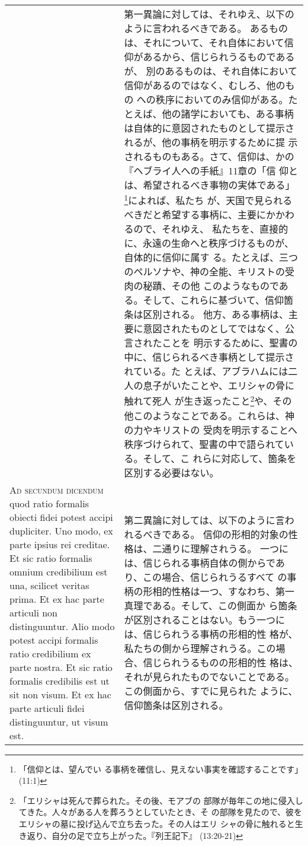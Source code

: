 \documentclass[10pt]{jsarticle} %
\begin{document}
\begin{longtable}{p{21em}p{21em}}
&


第一異論に対しては、それゆえ、以下のように言われるべきである。
あるものは、それについて、それ自体において信仰があるから、信じられうるものであるが、
 別のあるものは、それ自体において信仰があるのではなく、むしろ、他のもの
 への秩序においてのみ信仰がある。たとえば、他の諸学においても、ある事柄
 は自体的に意図されたものとして提示されるが、他の事柄を明示するために提
 示されるものもある。さて、信仰は、かの『ヘブライ人への手紙』11章の「信
 仰とは、希望されるべき事物の実体である」\footnote{「信仰とは、望んでい
 る事柄を確信し、見えない事実を確認することです」(11:1)}によれば、私たち
 が、天国で見られるべきだと希望する事柄に、主要にかかわるので、それゆえ、
 私たちを、直接的に、永遠の生命へと秩序づけるものが、自体的に信仰に属す
 る。たとえば、三つのペルソナや、神の全能、キリストの受肉の秘蹟、その他
 このようなものである。そして、これらに基づいて、信仰箇条は区別される。
 他方、ある事柄は、主要に意図されたものとしてではなく、公言されたことを
 明示するために、聖書の中に、信じられるべき事柄として提示されている。た
 とえば、アブラハムには二人の息子がいたことや、エリシャの骨に触れて死人
 が生き返ったこと\footnote{「エリシャは死んで葬られた。その後、モアブの
 部隊が毎年この地に侵入してきた。人々がある人を葬ろうとしていたとき、そ
 の部隊を見たので、彼をエリシャの墓に投げ込んで立ち去った。その人はエリ
 シャの骨に触れると生き返り、自分の足で立ち上がった。『列王記下』
 (13:20-21)}や、その他このようなことである。これらは、神の力やキリストの
 受肉を明示することへ秩序づけられて、聖書の中で語られている。そして、こ
 れらに対応して、箇条を区別する必要はない。

\\


{\scshape Ad secundum dicendum} quod ratio formalis
obiecti fidei potest accipi dupliciter. Uno modo, ex parte ipsius rei
creditae. Et sic ratio formalis omnium credibilium est una, scilicet
veritas prima. Et ex hac parte articuli non distinguuntur. Alio modo
potest accipi formalis ratio credibilium ex parte nostra. Et sic ratio
formalis credibilis est ut sit non visum. Et ex hac parte articuli fidei
distinguuntur, ut visum est.

&

第二異論に対しては、以下のように言われるべきである。
信仰の形相的対象の性格は、二通りに理解されうる。
一つには、信じられる事柄自体の側からであり、この場合、信じられうるすべて
 の事柄の形相的性格は一つ、すなわち、第一真理である。そして、この側面か
 ら箇条が区別されることはない。もう一つには、信じられうる事柄の形相的性
 格が、私たちの側から理解されうる。この場合、信じられうるものの形相的性
 格は、それが見られたものでないことである。この側面から、すでに見られた
 ように、信仰箇条は区別される。
\\



\end{longtable}
\end{document}
